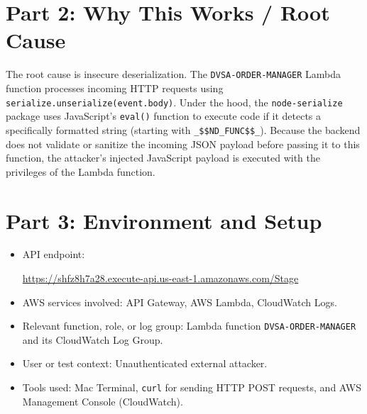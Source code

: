 \documentclass[12pt]{report}
\begin{document}
\section{Part 2: Why This Works / Root Cause}
The root cause is insecure deserialization. The \texttt{DVSA-ORDER-MANAGER} Lambda function processes incoming HTTP requests using \texttt{serialize.unserialize(event.body)}. Under the hood, the \texttt{node-serialize} package uses JavaScript's \texttt{eval()} function to execute code if it detects a specifically formatted string (starting with \texttt{\_\$\$ND\_FUNC\$\$\_}). Because the backend does not validate or sanitize the incoming JSON payload before passing it to this function, the attacker's injected JavaScript payload is executed with the privileges of the Lambda function.

\section{Part 3: Environment and Setup}
\begin{itemize}
  \item API endpoint:\par
  \url{https://shfz8h7a28.execute-api.us-east-1.amazonaws.com/Stage}
  \item AWS services involved: API Gateway, AWS Lambda, CloudWatch Logs.
  \item Relevant function, role, or log group: Lambda function \nolinkurl{DVSA-ORDER-MANAGER} and its CloudWatch Log Group.
  \item User or test context: Unauthenticated external attacker.
  \item Tools used: Mac Terminal, \texttt{curl} for sending HTTP POST requests, and AWS Management Console (CloudWatch).
\end{itemize}
\end{document}
